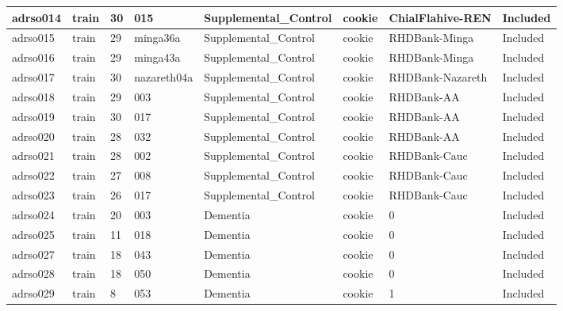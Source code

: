 \begin{center}
\begin{longtable}{|l|l|l|l|l|l|l|l|}
adrso014  & train            & 30           & 015         & Supplemental\_Control & cookie          & ChialFlahive-REN & Included      \\ \hline
adrso015  & train            & 29           & minga36a    & Supplemental\_Control & cookie          & RHDBank-Minga    & Included      \\ \hline
adrso016  & train            & 29           & minga43a    & Supplemental\_Control & cookie          & RHDBank-Minga    & Included      \\ \hline
adrso017  & train            & 30           & nazareth04a & Supplemental\_Control & cookie          & RHDBank-Nazareth & Included      \\ \hline
adrso018  & train            & 29           & 003         & Supplemental\_Control & cookie          & RHDBank-AA       & Included      \\ \hline
adrso019  & train            & 30           & 017         & Supplemental\_Control & cookie          & RHDBank-AA       & Included      \\ \hline
adrso020  & train            & 28           & 032         & Supplemental\_Control & cookie          & RHDBank-AA       & Included      \\ \hline
adrso021  & train            & 28           & 002         & Supplemental\_Control & cookie          & RHDBank-Cauc     & Included      \\ \hline
adrso022  & train            & 27           & 008         & Supplemental\_Control & cookie          & RHDBank-Cauc     & Included      \\ \hline
adrso023  & train            & 26           & 017         & Supplemental\_Control & cookie          & RHDBank-Cauc     & Included      \\ \hline
adrso024  & train            & 20           & 003         & Dementia             & cookie          & 0                & Included      \\ \hline
adrso025  & train            & 11           & 018         & Dementia             & cookie          & 0                & Included      \\ \hline
adrso027  & train            & 18           & 043         & Dementia             & cookie          & 0                & Included      \\ \hline
adrso028  & train            & 18           & 050         & Dementia             & cookie          & 0                & Included      \\ \hline
adrso029  & train            & 8            & 053         & Dementia             & cookie          & 1                & Included      \\ \hline

\end{longtable}
\end{center}
